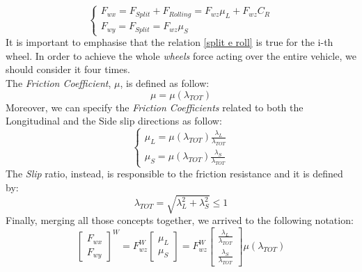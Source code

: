 \documentclass[a4paper,12pt,titlepage]{report}
\numberwithin{figure}{section}
\begin{document}
			\begin{equation} \label{split e roll}
				\begin{cases}
					F_{wx} = F_{Split} + F_{Rolling} = F_{wz} \mu_{L} + F_{wz} C_{R} \\
					F_{wy} = F_{Split} = F_{wz} \mu_{S}
				\end{cases}
			\end{equation}
		It is important to emphasise that the relation \ref{split e roll} is true for the i-th wheel. In order to achieve the whole \textit{wheels} force acting over the entire vehicle, we should consider it four times. \\ The \textit{Friction Coefficient}, $ \mu $, is defined as follow:
			\begin{equation}
				\mu = \mu(\lambda_{TOT})
			\end{equation}
		Moreover, we can specify the \textit{Friction Coefficients} related to both the Longitudinal and the Side slip directions as follow:
			\begin{equation}
				\begin{cases}
					\mu_{L} = \mu(\lambda_{TOT}) \frac{\lambda_{L}}{\lambda_{TOT}}\\
					\mu_{S} = \mu(\lambda_{TOT}) \frac{\lambda_{S}}{\lambda_{TOT}}
				\end{cases}
			\end{equation}
		The \textit{Slip} ratio, instead, is responsible to the friction resistance and it is defined by:
			\begin{equation}
			\lambda_{TOT} = \sqrt{\lambda_{L}^{2} + \lambda_{S}^{2}} \leq 1
			\end{equation}
		Finally, merging all those concepts together, we arrived to the following notation:	
			\begin{equation} \label{Force 1st part}
				\begin{bmatrix}
					F_{wx} \\
					F_{wy}
				\end{bmatrix}^{W} = 
				F_{wz}^{W}
				\begin{bmatrix}
					\mu_{L} \\
					\mu_{S}
				\end{bmatrix} = 
				F_{wz}^{W}
				\begin{bmatrix}
					\frac{\lambda_{L}}{\lambda_{TOT}} \\
					\frac{\lambda_{S}}{\lambda_{TOT}}
				\end{bmatrix}
				\mu(\lambda_{TOT})	
			\end{equation}
\end{document}
